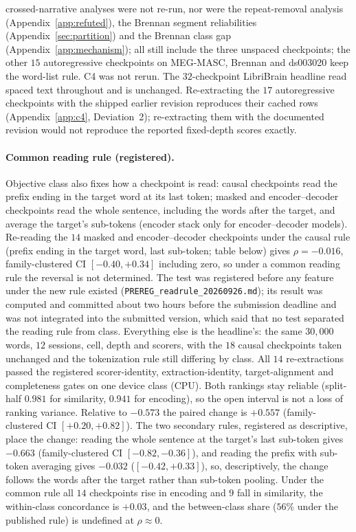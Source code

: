 \documentclass{article}
\begin{document}
crossed-narrative analyses were not re-run, nor were the repeat-removal analysis
(Appendix~\ref{app:refuted}), the Brennan segment reliabilities (Appendix~\ref{sec:partition}) and the
Brennan class gap (Appendix~\ref{app:mechanism}); all still include the three unspaced checkpoints; the
other $15$ autoregressive checkpoints on MEG-MASC, Brennan and ds003020 keep the word-list rule. C4
was not rerun. The $32$-checkpoint LibriBrain headline read spaced text throughout and is unchanged.
Re-extracting the $17$ autoregressive checkpoints with the shipped earlier revision reproduces
their cached rows (Appendix~\ref{app:c4}, Deviation~2); re-extracting them with the documented
revision would not reproduce the reported fixed-depth scores exactly.

\paragraph{Common reading rule (registered).}\label{app:readrule}
Objective class also fixes how a checkpoint is read: causal checkpoints read the prefix ending in the
target word at its last token; masked and encoder--decoder checkpoints read the whole sentence,
including the words after the target, and average the target's sub-tokens (encoder stack only for
encoder--decoder models). Re-reading the $14$ masked and encoder--decoder checkpoints under the causal
rule (prefix ending in the target word, last sub-token; table below) gives
$\rho = -0.016$, family-clustered CI $[-0.40, +0.34]$ including zero, so under a common reading rule
the reversal is not determined. The test was registered before any feature under the new rule existed
(\texttt{PREREG\_readrule\_20260926.md}); its result was computed and committed about two hours before
the submission deadline and was not integrated into the submitted version, which said that no test
separated the reading rule from class. Everything else is the headline's: the same $30{,}000$ words,
$12$ sessions, cell, depth and scorers, with the $18$ causal checkpoints taken unchanged and the
tokenization rule still differing by class. All $14$ re-extractions passed the registered
scorer-identity, extraction-identity, target-alignment and completeness gates on one device class
(CPU). Both rankings stay reliable (split-half $0.981$ for similarity, $0.941$ for encoding), so the
open interval is not a loss of ranking variance. Relative to $-0.573$ the paired change is $+0.557$
(family-clustered CI $[+0.20, +0.82]$). The two secondary rules, registered as descriptive, place the
change: reading the whole sentence at the target's last sub-token gives $-0.663$ (family-clustered CI
$[-0.82, -0.36]$), and reading the prefix with sub-token averaging gives $-0.032$ ($[-0.42, +0.33]$),
so, descriptively, the change follows the words after the target rather than sub-token pooling. Under
the common rule all $14$ checkpoints rise in encoding and $9$ fall in similarity, the within-class
concordance is $+0.03$, and the between-class share ($56\%$ under the published rule) is undefined
at $\rho\approx0$.
\end{document}

